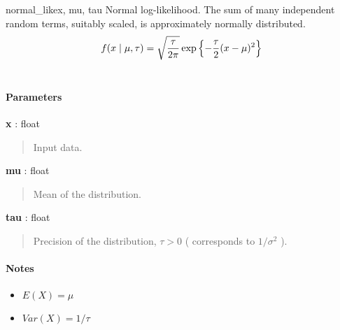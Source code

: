 \hypertarget{pymc.distributions.normal_like}{}
\begin{funcdesc}{normal\_like}{x, mu, tau}
Normal log-likelihood. The sum of many independent random terms, suitably scaled, is approximately normally distributed.
\begin{gather}
\begin{split}f(x \mid \mu, \tau) = \sqrt{\frac{\tau}{2\pi}} \exp\left\{ -\frac{\tau}{2} (x-\mu)^2 \right\}\end{split}\notag\\\begin{split}\end{split}\notag
\end{gather}\paragraph{Parameters}\begin{paramlist}

\item[] \textbf{x} : float
\begin{quote}

Input data.
\end{quote}

\item[] \textbf{mu} : float
\begin{quote}

Mean of the distribution.
\end{quote}

\item[] \textbf{tau} : float
\begin{quote}

Precision of the distribution, $\tau>0$ ( corresponds to $1/\sigma^2$ ).
\end{quote}
\end{paramlist}
\paragraph{Notes}
\begin{itemize}
\item {} 
$E(X) = \mu$

\item {} 
$Var(X) = 1/\tau$

\end{itemize}
\end{funcdesc}


